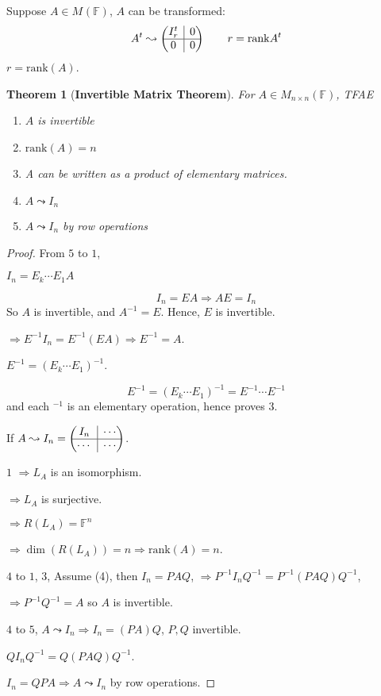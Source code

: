 \documentclass[12pt]{article}
\newtheorem{theorem}{Theorem}[subsection]
\newcommand{\rank}{\mathrm{rank}}
\newcommand{\mF}{{\mathbb{F}}}
\newcommand{\rvline}{\hspace*{-\arraycolsep}\vline\hspace*{-\arraycolsep}}
\begin{document}
Suppose $A \in M_{}(\mF)$, $A$ can be transformed: 
\[
	A^t \leadsto 
	\begin{pmatrix}
		I_r^t & \rvline & 0 \\ \hline
		0 & \rvline & 0
	\end{pmatrix}
	\qquad r = \rank A^t
\]
$r = \rank(A)$. 

\begin{theorem}[\textbf{Invertible Matrix Theorem}]
	For $A \in M_{n\times n}(\mF)$, TFAE
	\begin{enumerate}
		\item $A$ is invertible
		\item $\rank(A) = n$
		\item A can be written as a product of elementary matrices. 
		\item $A \leadsto I_n$
		\item $A \leadsto I_n$ by row operations
	\end{enumerate}
\end{theorem}
\begin{proof}
	From $5$ to $1$, 

	$I_n = E_k\cdots E_1A$ 

	\[
		I_n = EA \Rightarrow AE = I_n
	\]
	So $A$ is invertible, and $A^{-1} = E$. Hence, $E$ is invertible. 

	$\Rightarrow E^{-1} I_n = E^{-1}(EA) \Rightarrow E^{-1} = A$. 

	$E^{-1} = (E_k \cdots E_1)^{-1}$. 

	\[
		E^{-1} = (E_k\cdots E_1)^{-1} = E^{-1} \cdots E^{-1}
	\]
	and each $^{-1}$ is an elementary operation, hence proves 3. 

	If $A \leadsto I_n = 
	\begin{pmatrix}
		I_n & \rvline& \cdots \\ \hline
		\cdots &\rvline &\cdots \\
	\end{pmatrix}
	$.

	$1$ 
	$\Rightarrow L_A$ is an isomorphism.

	$\Rightarrow L_A$ is surjective.  
	
	$\Rightarrow R(L_A) = \mF^n$ 

	$\Rightarrow \dim(R(L_A)) = n \Rightarrow \rank(A) = n$. 

	$4$ to $1$, $3$, Assume (4), then $I_n = PAQ$, 
	$\Rightarrow P^{-1}I_nQ^{-1} = P^{-1}(PAQ)Q^{-1}$,

	$\Rightarrow P^{-1}Q^{-1} = A$ so $A$ is invertible. 

	$4$ to $5$, 
	$A \leadsto I_n \Rightarrow I_n = (PA)Q$, $P, Q$ invertible. 

	$QI_nQ^{-1} = Q(PAQ)Q^{-1}$. 

	$I_n = QPA \Rightarrow A \leadsto I_n$ by row operations. 

\end{proof}
\end{document}
